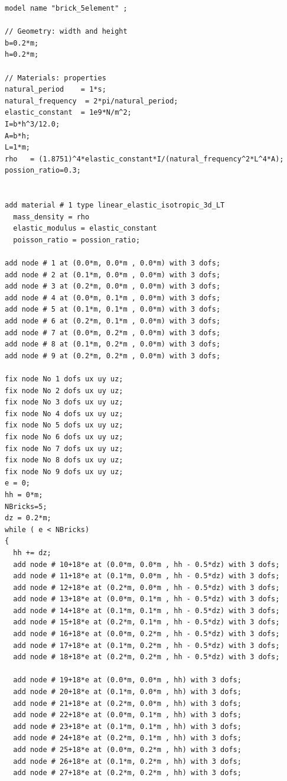 \begin{lstlisting}
model name "brick_5element" ;

// Geometry: width and height
b=0.2*m;
h=0.2*m;

// Materials: properties
natural_period    = 1*s;        
natural_frequency  = 2*pi/natural_period;
elastic_constant  = 1e9*N/m^2; 
I=b*h^3/12.0;
A=b*h;
L=1*m;
rho   = (1.8751)^4*elastic_constant*I/(natural_frequency^2*L^4*A);
possion_ratio=0.3;


add material # 1 type linear_elastic_isotropic_3d_LT
  mass_density = rho
  elastic_modulus = elastic_constant
  poisson_ratio = possion_ratio;

add node # 1 at (0.0*m, 0.0*m , 0.0*m) with 3 dofs;
add node # 2 at (0.1*m, 0.0*m , 0.0*m) with 3 dofs;
add node # 3 at (0.2*m, 0.0*m , 0.0*m) with 3 dofs;
add node # 4 at (0.0*m, 0.1*m , 0.0*m) with 3 dofs;
add node # 5 at (0.1*m, 0.1*m , 0.0*m) with 3 dofs;
add node # 6 at (0.2*m, 0.1*m , 0.0*m) with 3 dofs;
add node # 7 at (0.0*m, 0.2*m , 0.0*m) with 3 dofs;
add node # 8 at (0.1*m, 0.2*m , 0.0*m) with 3 dofs;
add node # 9 at (0.2*m, 0.2*m , 0.0*m) with 3 dofs;

fix node No 1 dofs ux uy uz;
fix node No 2 dofs ux uy uz;
fix node No 3 dofs ux uy uz;
fix node No 4 dofs ux uy uz;
fix node No 5 dofs ux uy uz;
fix node No 6 dofs ux uy uz;
fix node No 7 dofs ux uy uz;
fix node No 8 dofs ux uy uz;
fix node No 9 dofs ux uy uz;
e = 0;
hh = 0*m;
NBricks=5;
dz = 0.2*m;
while ( e < NBricks)
{
  hh += dz;
  add node # 10+18*e at (0.0*m, 0.0*m , hh - 0.5*dz) with 3 dofs;
  add node # 11+18*e at (0.1*m, 0.0*m , hh - 0.5*dz) with 3 dofs;
  add node # 12+18*e at (0.2*m, 0.0*m , hh - 0.5*dz) with 3 dofs;
  add node # 13+18*e at (0.0*m, 0.1*m , hh - 0.5*dz) with 3 dofs;
  add node # 14+18*e at (0.1*m, 0.1*m , hh - 0.5*dz) with 3 dofs;
  add node # 15+18*e at (0.2*m, 0.1*m , hh - 0.5*dz) with 3 dofs;
  add node # 16+18*e at (0.0*m, 0.2*m , hh - 0.5*dz) with 3 dofs;
  add node # 17+18*e at (0.1*m, 0.2*m , hh - 0.5*dz) with 3 dofs;
  add node # 18+18*e at (0.2*m, 0.2*m , hh - 0.5*dz) with 3 dofs;
  
  add node # 19+18*e at (0.0*m, 0.0*m , hh) with 3 dofs;
  add node # 20+18*e at (0.1*m, 0.0*m , hh) with 3 dofs;
  add node # 21+18*e at (0.2*m, 0.0*m , hh) with 3 dofs;
  add node # 22+18*e at (0.0*m, 0.1*m , hh) with 3 dofs;
  add node # 23+18*e at (0.1*m, 0.1*m , hh) with 3 dofs;
  add node # 24+18*e at (0.2*m, 0.1*m , hh) with 3 dofs;
  add node # 25+18*e at (0.0*m, 0.2*m , hh) with 3 dofs;
  add node # 26+18*e at (0.1*m, 0.2*m , hh) with 3 dofs;
  add node # 27+18*e at (0.2*m, 0.2*m , hh) with 3 dofs;


\end{lstlisting}

